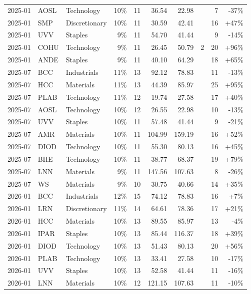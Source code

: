 \documentclass[11pt,a4paper]{article}
\begin{document}
{\begin{longtable}{l l l r r r r r r r}
2025-01 & AOSL & Technology & 10\% & 11 & 36.54 & 22.98 &  & 7 & -37\% \\
2025-01 & SMP & Discretionary & 10\% & 11 & 30.59 & 42.41 &  & 16 & +47\% \\
2025-01 & UVV & Staples & 9\% & 11 & 54.70 & 41.44 &  & 9 & -14\% \\
2025-01 & COHU & Technology & 9\% & 11 & 26.45 & 50.79 & 2 & 20 & +96\% \\
2025-01 & ANDE & Staples & 9\% & 11 & 40.10 & 64.29 &  & 18 & +65\% \\
2025-07 & BCC & Industrials & 11\% & 13 & 92.12 & 78.83 &  & 11 & -13\% \\
2025-07 & HCC & Materials & 11\% & 13 & 44.39 & 85.97 &  & 25 & +95\% \\
2025-07 & PLAB & Technology & 11\% & 12 & 19.74 & 27.58 &  & 17 & +40\% \\
2025-07 & AOSL & Technology & 10\% & 12 & 26.55 & 22.98 &  & 10 & -13\% \\
2025-07 & UVV & Staples & 10\% & 11 & 57.48 & 41.44 &  & 9 & -21\% \\
2025-07 & AMR & Materials & 10\% & 11 & 104.99 & 159.19 &  & 16 & +52\% \\
2025-07 & DIOD & Technology & 10\% & 11 & 55.30 & 80.13 &  & 16 & +45\% \\
2025-07 & BHE & Technology & 10\% & 11 & 38.77 & 68.37 &  & 19 & +79\% \\
2025-07 & LNN & Materials & 9\% & 11 & 147.56 & 107.63 &  & 8 & -26\% \\
2025-07 & WS & Materials & 9\% & 10 & 30.75 & 40.66 &  & 14 & +35\% \\
2026-01 & BCC & Industrials & 12\% & 15 & 74.12 & 78.83 &  & 16 & +7\% \\
2026-01 & LRN & Discretionary & 11\% & 14 & 64.61 & 78.36 &  & 17 & +21\% \\
2026-01 & HCC & Materials & 10\% & 13 & 89.55 & 85.97 &  & 13 & -4\% \\
2026-01 & IPAR & Staples & 10\% & 13 & 85.44 & 116.37 &  & 18 & +39\% \\
2026-01 & DIOD & Technology & 10\% & 13 & 51.43 & 80.13 &  & 20 & +56\% \\
2026-01 & PLAB & Technology & 10\% & 13 & 33.41 & 27.58 &  & 10 & -17\% \\
2026-01 & UVV & Staples & 10\% & 13 & 52.58 & 41.44 &  & 11 & -16\% \\
2026-01 & LNN & Materials & 10\% & 12 & 121.15 & 107.63 &  & 11 & -10\% \\

\end{longtable}}
\end{document}
